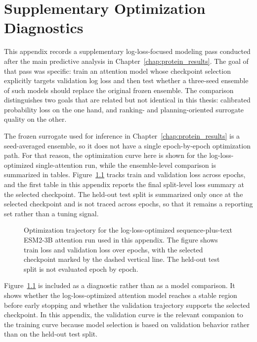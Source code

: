 \chapter{Supplementary Optimization Diagnostics} \label{chap:appendix-b}

This appendix records a supplementary log-loss-focused modeling pass conducted after the main predictive analysis in Chapter~\ref{chap:protein_results}. The goal of that pass was specific: train an attention model whose checkpoint selection explicitly targets validation log loss and then test whether a three-seed ensemble of such models should replace the original frozen ensemble. The comparison distinguishes two goals that are related but not identical in this thesis: calibrated probability loss on the one hand, and ranking- and planning-oriented surrogate quality on the other.

The frozen surrogate used for inference in Chapter~\ref{chap:protein_results} is a seed-averaged ensemble, so it does not have a single epoch-by-epoch optimization path. For that reason, the optimization curve here is shown for the log-loss-optimized single-attention run, while the ensemble-level comparison is summarized in tables. Figure~\ref{fig:appb_training_loss_curve} tracks train and validation loss across epochs, and the first table in this appendix reports the final split-level loss summary at the selected checkpoint. The held-out test split is summarized only once at the selected checkpoint and is not traced across epochs, so that it remains a reporting set rather than a tuning signal.

\begin{figure}[ht]
\centering
{}
\caption[Optimization curve for the log-loss attention run]{Optimization trajectory for the log-loss-optimized sequence-plus-text ESM2-3B attention run used in this appendix. The figure shows train loss and validation loss over epochs, with the selected checkpoint marked by the dashed vertical line. The held-out test split is not evaluated epoch by epoch.}
\label{fig:appb_training_loss_curve}
\end{figure}

Figure~\ref{fig:appb_training_loss_curve} is included as a diagnostic rather than as a model comparison. It shows whether the log-loss-optimized attention model reaches a stable region before early stopping and whether the validation trajectory supports the selected checkpoint. In this appendix, the validation curve is the relevant companion to the training curve because model selection is based on validation behavior rather than on the held-out test split.

